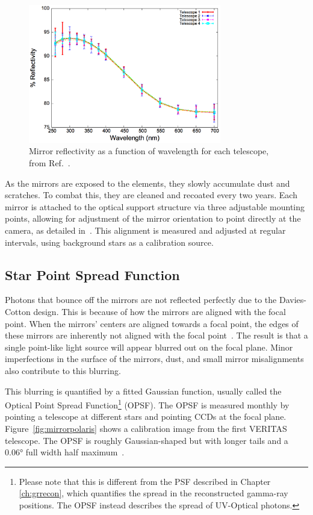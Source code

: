 \begin{figure}[ht]
  \centering
  \includegraphics[width=0.75\textwidth]{images/mirror_reflect}
  \caption[Mirror Reflectivity]{
    Mirror reflectivity as a function of wavelength for each telescope, from Ref.~\cite{mirrorfacets}. 
  }
  \label{fig:mirreflect}
\end{figure}

As the mirrors are exposed to the elements, they slowly accumulate dust and scratches.
To combat this, they are cleaned and recoated every two years.
Each mirror is attached to the optical support structure via three adjustable mounting points, allowing for adjustment of the mirror orientation to point directly at the camera, as detailed in~\cite{mirroralign}.
This alignment is measured and adjusted at regular intervals, using background stars as a calibration source.

\subsection{Star Point Spread Function}

Photons that bounce off the mirrors are not reflected perfectly due to the Davies-Cotton design.
This is because of how the mirrors are aligned with the focal point.
When the mirrors' centers are aligned towards a focal point, the edges of these mirrors are inherently not aligned with the focal point~\cite{daviscotton_optical}.
The result is that a single point-like light source will appear blurred out on the focal plane.
Minor imperfections in the surface of the mirrors, dust, and small mirror misalignments also contribute to this blurring.

This blurring is quantified by a fitted Gaussian function, usually called the Optical Point Spread Function\footnote{Please note that this is different from the PSF described in Chapter \ref{ch:grrecon}, which quantifies the spread in the reconstructed gamma-ray positions.  The OPSF instead describes the spread of UV-Optical photons.} (OPSF).
The OPSF is measured monthly by pointing a telescope at different stars and pointing CCDs at the focal plane.
Figure~\ref{fig:mirrorpolaris} shows a calibration image from the first VERITAS telescope.
The OPSF is roughly Gaussian-shaped but with longer tails and a $ \ang{0.06} $ full width half maximum~\cite{Veritas_Detector}.

